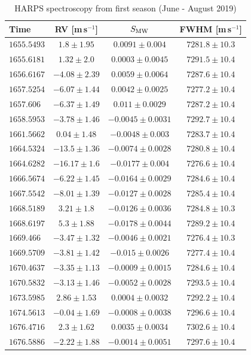 \documentclass[fleqn,usenatbib]{mnras}
\newcommand{\harps}{{HARPS}}
\newcommand{\ms}{m\,s$^{-1}$}
\begin{document}
\begin{table}
\caption{\harps{} spectroscopy from first season (June - August 2019)}
\label{tab:spec1}
\small
\begin{tabular}{lccc}
\hline
\hline
Time & RV [\ms{}] & $S_{\rm MW}$ & FWHM [\ms{}] \\
\hline
\hline
$1655.5493$ & $1.8\pm1.95$ & $0.0091\pm0.004$ & $7281.8\pm10.3$ \\
$1655.6181$ & $1.32\pm2.0$ & $0.0003\pm0.0045$ & $7291.5\pm10.4$ \\
$1656.6167$ & $-4.08\pm2.39$ & $0.0059\pm0.0064$ & $7287.6\pm10.4$ \\
$1657.5254$ & $-6.07\pm1.44$ & $0.0042\pm0.0025$ & $7277.2\pm10.4$ \\
$1657.606$ & $-6.37\pm1.49$ & $0.011\pm0.0029$ & $7287.2\pm10.4$ \\
$1658.5953$ & $-3.78\pm1.46$ & $-0.0045\pm0.0031$ & $7292.7\pm10.4$ \\
$1661.5662$ & $0.04\pm1.48$ & $-0.0048\pm0.003$ & $7283.7\pm10.4$ \\
$1664.5324$ & $-13.5\pm1.36$ & $-0.0074\pm0.0028$ & $7280.8\pm10.4$ \\
$1664.6282$ & $-16.17\pm1.6$ & $-0.0177\pm0.004$ & $7276.6\pm10.4$ \\
$1666.5674$ & $-6.22\pm1.45$ & $-0.0164\pm0.0029$ & $7284.6\pm10.4$ \\
$1667.5542$ & $-8.01\pm1.39$ & $-0.0127\pm0.0028$ & $7285.4\pm10.4$ \\
$1668.5189$ & $3.21\pm1.8$ & $-0.0126\pm0.0036$ & $7284.8\pm10.3$ \\
$1668.6197$ & $5.3\pm1.88$ & $-0.0178\pm0.0044$ & $7289.2\pm10.4$ \\
$1669.466$ & $-3.47\pm1.32$ & $-0.0046\pm0.0021$ & $7276.4\pm10.3$ \\
$1669.5709$ & $-3.81\pm1.42$ & $-0.015\pm0.0026$ & $7277.4\pm10.4$ \\
$1670.4637$ & $-3.35\pm1.13$ & $-0.0009\pm0.0015$ & $7284.6\pm10.4$ \\
$1670.5832$ & $-3.13\pm1.46$ & $-0.0052\pm0.0028$ & $7293.5\pm10.4$ \\
$1673.5985$ & $2.86\pm1.53$ & $0.0004\pm0.0032$ & $7292.2\pm10.4$ \\
$1674.5613$ & $-0.04\pm1.69$ & $-0.0008\pm0.0038$ & $7296.6\pm10.4$ \\
$1676.4716$ & $2.3\pm1.62$ & $0.0035\pm0.0034$ & $7302.6\pm10.4$ \\
$1676.5886$ & $-2.22\pm1.88$ & $-0.0014\pm0.0051$ & $7297.6\pm10.4$ \\

\end{tabular}
\end{table}
\end{document}
